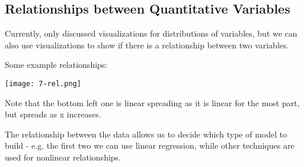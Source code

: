 \subsection{Relationships between Quantitative Variables}
Currently, only discussed visualizations for distributions of variables, but we can also use visualizations to show if there is a relationship between two variables.

Some example relationships:
\begin{center}
\texttt{[image: 7-rel.png]}
\end{center}
Note that the bottom left one is linear spreading as it is linear for the most part, but spreads as x increases. 

The relationship between the data allows us to decide which type of model to build - e.g. the first two we can use linear regression, while other techniques are used for nonlinear relationships.
